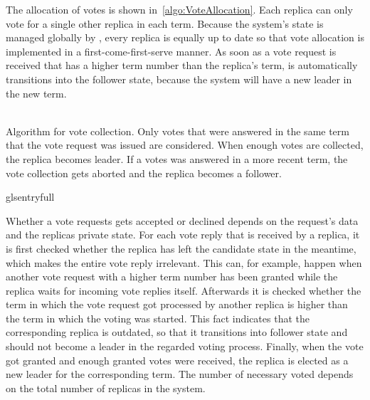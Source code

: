 The allocation of votes is shown in~\autoref{algo:VoteAllocation}.
Each replica can only vote for a single other replica in each term.
Because the system's state is managed globally by , every replica is equally up to date so that vote allocation is implemented in a first-come-first-serve manner.
As soon as a vote request is received that has a higher term number than the replica's term, is automatically transitions into the follower state, because the system will have a new leader in the new term.
\\\\
\begin{algorithm}[H]\caption{Algorithm for vote collection. Only votes that were answered in the same term that the vote request was issued are considered. When enough votes are collected, the replica becomes leader. If a votes was answered in a more recent term, the vote collection gets aborted and the replica becomes a follower.}\label{algo:VoteCollection}

glsentryfull
\BlankLine

\end{algorithm}

Whether a vote requests gets accepted or declined depends on the request's data and the replicas private state.
For each vote reply that is received by a replica, it is first checked whether the replica has left the candidate state in the meantime, which makes the entire vote reply irrelevant.
This can, for example, happen when another vote request with a higher term number has been granted while the replica waits for incoming vote replies itself.
Afterwards it is checked whether the term in which the vote request got processed by another replica is higher than the term in which the voting was started.
This fact indicates that the corresponding replica is outdated, so that it transitions into follower state and should not become a leader in the regarded voting process.
Finally, when the vote got granted and enough granted votes were received, the replica is elected as a new leader for the corresponding term.
The number of necessary voted depends on the total number of replicas in the system.

